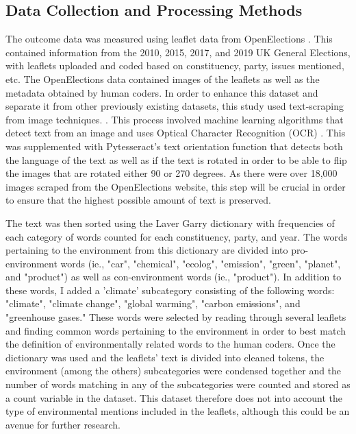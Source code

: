 \documentclass[preprint,12pt,authoryear]{elsarticle}
\begin{document}
\subsection{Data Collection and Processing Methods}

The outcome data was measured using leaflet data from OpenElections \citep{milazzo2020openelections}. This contained information from the 2010, 2015, 2017, and 2019 UK General Elections, with leaflets uploaded and coded based on constituency, party, issues mentioned, etc. The OpenElections data contained images of the leaflets as well as the metadata obtained by human coders. In order to enhance this dataset and separate it from other previously existing datasets, this study used text-scraping from image techniques. \citep{KerasocrKeras_ocrDocumentation,hoffstaetterPytesseractPythontesseractPython}. This process involved machine learning algorithms that detect text from an image and uses Optical Character Recognition (OCR) \citep{madhugiriExtractTextImages2022}. This was supplemented with Pytesseract's text orientation function that detects both the language of the text as well as if the text is rotated \citep{rosebrockCorrectingTextOrientation2022} in order to be able to flip the images that are rotated either 90 or 270 degrees. As there were over 18,000 images scraped from the OpenElections website, this step will be crucial in order to ensure that the highest possible amount of text is preserved. 



The text was then sorted using the Laver Garry dictionary \citep{laverEstimatingPolicyPositions2000} with frequencies of each category of words counted for each constituency, party, and year. The words pertaining to the environment from this dictionary are divided into pro-environment words (ie., "car", "chemical", "ecolog", "emission", "green", "planet", and "product") as well as con-environment words (ie., "product"). In addition to these words, I added a 'climate' subcategory consisting of the following words: "climate", "climate change", "global warming", "carbon emissions", and "greenhouse gases." These words were selected by reading through several leaflets and finding common words pertaining to the environment in order to best match the definition of environmentally related words to the human coders. Once the dictionary was used and the leaflets' text is divided into cleaned tokens, the environment (among the others) subcategories were condensed together and the number of words matching in any of the subcategories were counted and stored as a count variable in the dataset. This dataset therefore does not into account the type of environmental mentions included in the leaflets, although this could be an avenue for further research. 
\end{document}
